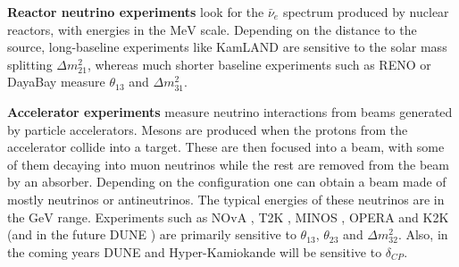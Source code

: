 \textbf{Reactor neutrino experiments} look for the $\bar{\nu}_{e}$ spectrum produced by nuclear reactors, with energies in the $\mathrm{MeV}$ scale. Depending on the distance to the source, long-baseline experiments like KamLAND \cite{KamLAND2013} are sensitive to the solar mass splitting $\Delta m^{2}_{21}$, whereas much shorter baseline experiments such as RENO \cite{RENO2018} or DayaBay \cite{DayaBay2018} measure $\theta_{13}$ and $\Delta m^{2}_{31}$.

\textbf{Accelerator experiments} measure neutrino interactions from beams generated by particle accelerators. Mesons are produced when the protons from the accelerator collide into a target. These are then focused into a beam, with some of them decaying into muon neutrinos while the rest are removed from the beam by an absorber. Depending on the configuration one can obtain a beam made of mostly neutrinos or antineutrinos. The typical energies of these neutrinos are in the $\mathrm{GeV}$ range. Experiments such as NOvA \cite{NOvA2023}, T2K \cite{T2K2023}, MINOS \cite{MINOS2014}, OPERA \cite{OPERA2018} and K2K \cite{K2K2006} (and in the future DUNE \cite{DUNE2020}) are primarily sensitive to $\theta_{13}$, $\theta_{23}$ and $\Delta m^{2}_{32}$. Also, in the coming years DUNE \cite{DUNE2020} and Hyper-Kamiokande \cite{Hyper-Kamiokande2019} will be sensitive to $\delta_{CP}$.

